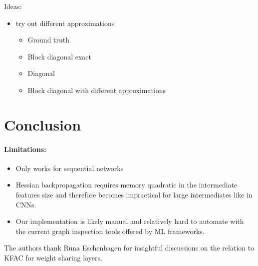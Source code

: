 \documentclass{article}
\begin{document}
Ideas:
\begin{itemize}
\item try out different approximations
  \begin{itemize}
  \item Ground truth
  \item Block diagonal exact
  \item Diagonal
  \item Block diagonal with different approximations
  \end{itemize}
\end{itemize}

\section{Conclusion}

\paragraph{Limitations:}
\begin{itemize}
\item Only works for sequential networks
\item Hessian backpropagation requires memory quadratic in the intermediate features size and therefore becomes impractical for large intermediates like in CNNs.
\item Our implementation is likely manual and relatively hard to automate with the current graph inspection tools offered by ML frameworks.
\end{itemize}

\begin{ack} %
  The authors thank Runa Eschenhagen for insightful discussions on the relation to KFAC for weight sharing layers.
\end{ack}




\clearpage
\appendix



\end{document}
